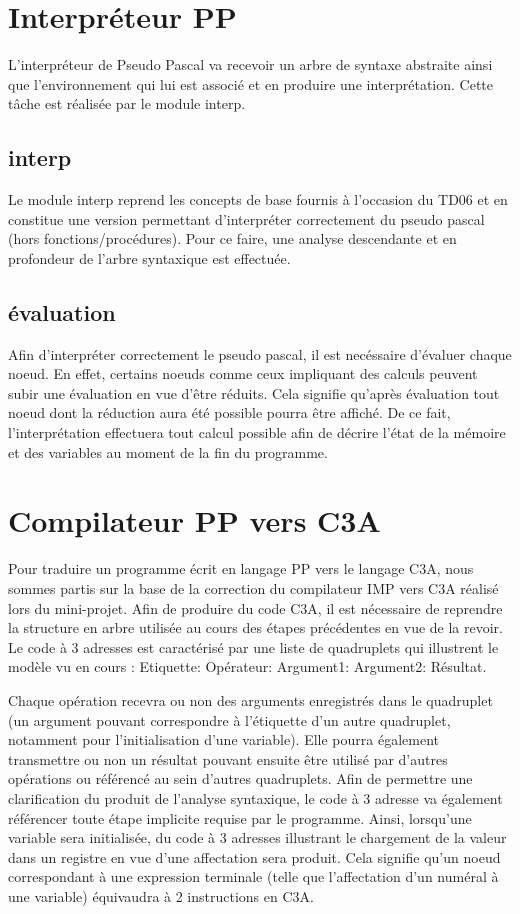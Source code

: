 \documentclass[11pt,a4paper]{article}
\begin{document}
\pagebreak
\section{Interpréteur PP}
L'interpréteur de Pseudo Pascal va recevoir un arbre de syntaxe abstraite ainsi que l'environnement qui lui est associé et en produire une interprétation.
Cette tâche est réalisée par le module interp.
\subsection{interp}
Le module interp reprend les concepts de base fournis à l'occasion du TD06 et en constitue une version permettant d'interpréter correctement du pseudo pascal (hors fonctions/procédures).
Pour ce faire, une analyse descendante et en profondeur de l'arbre syntaxique est effectuée.
\subsection{évaluation}
Afin d'interpréter correctement le pseudo pascal, il est necéssaire d'évaluer chaque noeud.
En effet, certains noeuds comme ceux impliquant des calculs peuvent subir une évaluation en vue d'être réduits.
Cela signifie qu'après évaluation tout noeud dont la réduction aura été possible pourra être affiché.
De ce fait, l'interprétation effectuera tout calcul possible afin de décrire l'état de la mémoire et des variables au moment de la fin du programme.
\pagebreak
\section{Compilateur PP vers C3A}
Pour traduire un programme écrit en langage PP vers le langage C3A, nous sommes partis sur la base de la correction du compilateur IMP vers C3A réalisé lors du mini-projet.
Afin de produire du code C3A, il est nécessaire de reprendre la structure en arbre utilisée au cours des étapes précédentes en vue de la revoir.
Le code à 3 adresses est caractérisé par une liste de quadruplets qui illustrent le modèle vu en cours :
Etiquette: Opérateur: Argument1: Argument2: Résultat.
\par
Chaque opération recevra ou non des arguments enregistrés dans le quadruplet (un argument pouvant correspondre à l'étiquette d'un autre quadruplet, notamment pour l'initialisation d'une variable).
Elle pourra également transmettre ou non un résultat pouvant ensuite être utilisé par d'autres opérations ou référencé au sein d'autres quadruplets.
Afin de permettre une clarification du produit de l'analyse syntaxique, le code à 3 adresse va également référencer toute étape implicite requise par le programme.
Ainsi, lorsqu'une variable sera initialisée, du code à 3 adresses illustrant le chargement de la valeur dans un registre en vue d'une affectation sera produit.
Cela signifie qu'un noeud correspondant à une expression terminale (telle que l'affectation d'un numéral à une variable) équivaudra à 2 instructions en C3A.
\pagebreak
\end{document}
